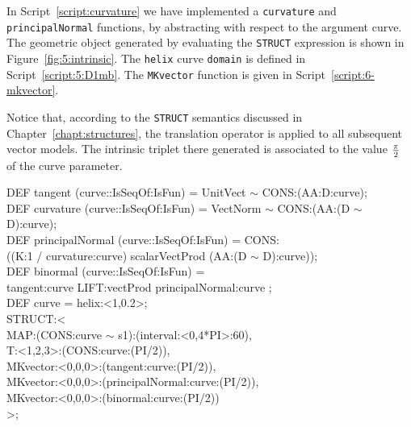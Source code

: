 \documentclass{31x47jw}
\begin{document}
In Script~\ref{script:curvature} we have implemented a
\texttt{curvature} and \texttt{principalNormal} functions, by
abstracting with respect to the argument curve.  The geometric object
generated by evaluating the \texttt{STRUCT} expression is shown in
Figure~\ref{fig:5:intrinsic}.  The \texttt{helix} curve
\texttt{domain} is defined in Script~\ref{script:5:D1mb}. The 
\texttt{MKvector} function is given in Script~\ref{script:6-mkvector}.

Notice that, according to the \texttt{STRUCT} semantics discussed in 
Chapter~\ref{chapt:structures}, the translation operator is applied 
to all subsequent vector models. The intrinsic triplet there generated 
is associated to the value $\pi\over 2$ of the curve parameter.

    
\begin{script} 
\begin{smallplasm}
DEF tangent  (curve::IsSeqOf:IsFun) = UnitVect $\sim$ CONS:(AA:D:curve);\\
DEF curvature  (curve::IsSeqOf:IsFun) = 
VectNorm $\sim$ CONS:(AA:(D $\sim$ D):curve);\\
DEF principalNormal  (curve::IsSeqOf:IsFun) = CONS:\+\\
  ((K:1 / curvature:curve) scalarVectProd (AA:(D $\sim$ D):curve)); \-\\
DEF binormal  (curve::IsSeqOf:IsFun) = \+\\
  tangent:curve LIFT:vectProd principalNormal:curve ;\-\\[0.3cm]

DEF curve = helix:<1,0.2>;\\
STRUCT:<\+\\
  MAP:(CONS:curve  $\sim$  s1):(interval:<0,4*PI>:60),\\
  T:<1,2,3>:(CONS:curve:(PI/2)),\\
  MKvector:<0,0,0>:(tangent:curve:(PI/2)),\\
  MKvector:<0,0,0>:(principalNormal:curve:(PI/2)),\\
  MKvector:<0,0,0>:(binormal:curve:(PI/2))\-\\
>;
\end{smallplasm}
\label{script:curvature}
\end{script}
\end{document}
